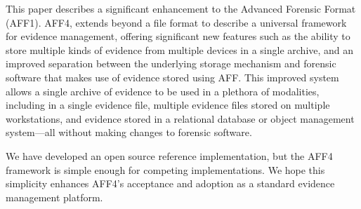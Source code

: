 \documentclass[10pt, conference]{IEEEtran}
\begin{document}
This paper describes a significant enhancement to the Advanced
Forensic Format (AFF1). AFF4, extends beyond a file format to describe
a universal framework for evidence management, offering significant
new features such as the ability to store multiple kinds of evidence
from multiple devices in a single archive, and an improved separation
between the underlying storage mechanism and forensic software that
makes use of evidence stored using AFF. This improved system allows a
single archive of evidence to be used in a plethora of modalities,
including in a single evidence file, multiple evidence files stored on
multiple workstations, and evidence stored in a relational database or
object management system---all without making changes to forensic
software.

We have developed an open source reference implementation, but the
AFF4 framework is simple enough for competing implementations. We hope
this simplicity enhances AFF4's acceptance and adoption as a standard
evidence management platform.



\end{document}
